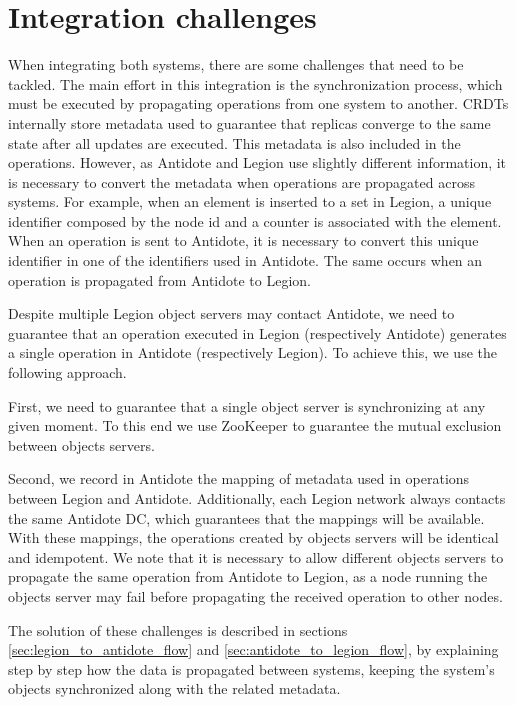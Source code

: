 \section{Integration challenges}
\label{sec:integration_challenges}
When integrating both systems, there are some challenges that need to be tackled. The main effort in this integration is the synchronization process, which must be executed by propagating operations from one system to another. CRDTs internally store metadata used to guarantee that replicas converge to the same state after all updates are executed. This metadata is also included in the operations. However, as Antidote and Legion use slightly different information, it is necessary to convert the metadata when operations are propagated across systems. For example, when an element is inserted to a set in Legion, a unique identifier composed by the node id and a counter is associated with the element. When an operation is sent to Antidote, it is necessary to convert this unique identifier in one of the identifiers used in Antidote. The same occurs when an operation is propagated from Antidote to Legion.\par
	Despite multiple Legion object servers may contact Antidote, we need to guarantee that an operation executed in Legion (respectively Antidote) generates a single operation in Antidote (respectively Legion). To achieve this, we use the following approach.\par
	First, we need to guarantee that a single object server is synchronizing at any given moment. To this end we use ZooKeeper to guarantee the mutual exclusion between objects servers.\par
	Second, we record in Antidote the mapping of metadata used in operations between Legion and Antidote. Additionally, each Legion network always contacts the same Antidote DC, which guarantees that the mappings will be available. With these mappings, the operations created by objects servers will be identical and idempotent. We note that it is necessary to allow different objects servers to propagate the same operation from Antidote to Legion, as a node running the objects server may fail before propagating the received operation to other nodes.\par
	The solution of these challenges is described in sections \ref{sec:legion_to_antidote_flow} and \ref{sec:antidote_to_legion_flow}, by explaining step by step how the data is propagated between systems, keeping the system's objects synchronized along with the related metadata.

